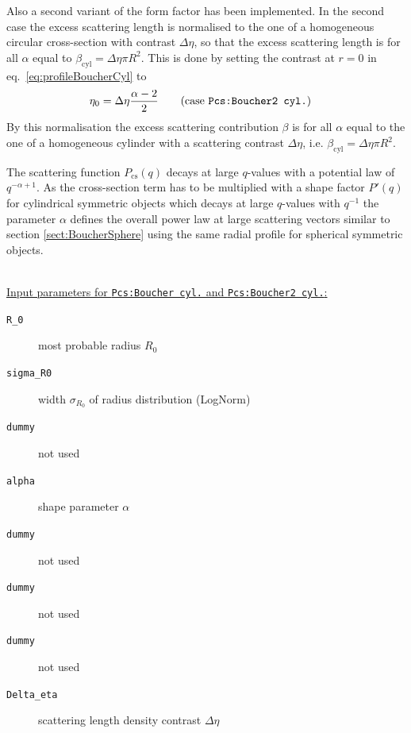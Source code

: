  Also a second variant of the form factor has been implemented. In the second case the excess scattering length is normalised to the one of a homogeneous circular cross-section with contrast $\Delta\eta$, so that the excess scattering length is for all $\alpha$ equal to $\beta_\mathrm{cyl}=\Delta\eta \pi R^2$. This is done by setting the contrast at $r=0$ in eq.\ \ref{eq:profileBoucherCyl} to
\begin{align}
\eta_0&=\Delta\eta \frac{\alpha-2}{2}  \qquad \mbox{(case \texttt{Pcs:Boucher2 cyl.})}
\label{eq:eta0BoucherCyl2}
\end{align}
By this normalisation the excess scattering contribution $\beta$ is for all $\alpha$ equal to the one of a homogeneous cylinder with a scattering contrast $\Delta\eta$, i.e. $\beta_\mathrm{cyl}=\Delta\eta \pi R^2$.

 The scattering function $P_\mathrm{cs}(q)$ decays at large $q$-values with a potential law of $q^{-\alpha+1}$. As the cross-section term has to be multiplied with a shape factor $P'(q)$ for cylindrical symmetric objects which decays at large $q$-values with $q^{-1}$ the parameter $\alpha$ defines the overall power law at large scattering vectors similar to section \ref{sect:BoucherSphere} using the same radial profile for spherical symmetric objects.

\vspace{1mm}

\hspace{1pt}\\
\uline{Input parameters for \texttt{Pcs:Boucher cyl.} and \texttt{Pcs:Boucher2 cyl.}:}
\begin{description}
    \item[\texttt{R\_0}] most probable radius $R_0$
    \item[\texttt{sigma\_R0}] width $\sigma_{R_0}$ of radius distribution (LogNorm)
    \item[\texttt{dummy}] not used
    \item[\texttt{alpha}] shape parameter $\alpha$
    \item[\texttt{dummy}] not used
    \item[\texttt{dummy}] not used
    \item[\texttt{dummy}] not used
    \item[\texttt{Delta\_eta}] scattering length density contrast $\Delta \eta$
\end{description}

